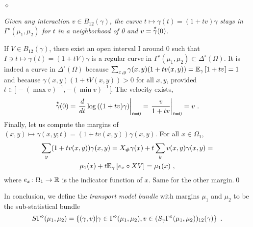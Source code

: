 \documentclass[runningheads]{llncs}
\begin{document}
\paragraph{$\bm\diamond$} \emph{Given any interaction $v \in B_{12}(\gamma)$, the curve $t \mapsto \gamma(t) = (1+tv)\gamma$ stays in $\Gamma^\circ(\mu_1,\mu_2)$ for $t$ in a neighborhood of 0 and $v = \overset{\star}{\gamma}(0)$.} 

If $V \in B_{12}(\gamma)$, there exist an open interval I around 0 such that $I \ni t \mapsto \gamma(t) = (1+tV)\gamma$ is a regular curve in $\Gamma^\circ(\mu_1,\mu_2) \subset \Delta^\circ(\Omega)$. It is indeed a curve in $\Delta^\circ(\Omega)$ because $\sum_{x,y} \gamma(x,y)(1+tv(x,y)) = {\operatorname{\mathbb E}}_{\gamma}\left[1+tv\right] = 1$ and because $\gamma(x,y)(1+tV(x,y)) > 0$ for all $x,y$, provided $t \in ]- (\max v)^{-1}, - (\min v)^{-1}[$.  The velocity exists,
%
\    \begin{equation*}
     \overset{\star}{\gamma}(0) = \left.  \frac{d}{dt} \log\left( (1+tv)\gamma \right) \right|_{t=0} = \left. \frac v {1+tv} \right|_{t=0} = v \ .
    \end{equation*}
%
Finally, let us compute the margins of $(x,y) \mapsto \gamma(x,y;t) = (1+tv(x,y))\gamma(x,y)$. For all $x \in \Omega_1$,
%
\begin{multline*}
  \sum_y (1+tv(x,y))\gamma(x,y) = X_\# \gamma(x) + t \sum_y v(x,y)\gamma(x,y) = \\ \mu_1(x) + t {\operatorname{\mathbb E}}_{\gamma}\left[e_x\circ X V\right] = \mu_1(x) \ ,
\end{multline*}
%
where $e_x \colon \Omega_1 \to \mathbb R$ is the indicator function of $x$. Same for the other margin.\qed

%
In conclusion, we define the \emph{transport model bundle} with margins $\mu_1$ and $\mu_2$ to be the sub-statistical bundle
%
\begin{equation} \label{eq:2}
  S\Gamma^\circ(\mu_1,\mu_2) = \left\{ (\gamma,v) \middle| \gamma\in\Gamma^\circ(\mu_1,\mu_2),v \in (S_\gamma\Gamma^\circ(\mu_1,\mu_2))_{12}(\gamma) \right\} \ .
\end{equation}
\end{document}
